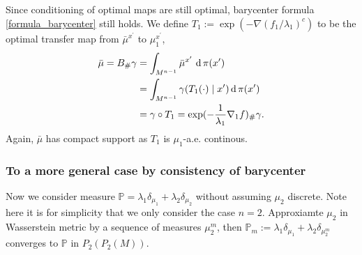 Since conditioning of optimal maps are still optimal,
barycenter formula \cref{formula_barycenter} still holds.
We define $T_1 := \exp(-\nabla (f_1/\lambda_1)^c)$ to be the optimal transfer map from $\bar{\mu}^{x^\prime}$ to $\mu_1^{x^\prime}$,
\begin{align*}
	\bar{\mu} = B_{\#} \gamma & =
	\int_{M^{n-1}}\bar{\mu}^{x^\prime} \, \operatorname{d} \pi(x^\prime)                         \\
	                          & = \int_{M^{n-1}} \gamma( T_1(\cdot) \mid x^\prime) \operatorname{d} \pi(x^\prime)      \\
	                          & = \gamma \circ T_1 = \exp (- \frac{1}{\lambda_1} \nabla_1 f)_{\#} \gamma
	.
\end{align*}
Again, $\bar{\mu}$ has compact support as $T_1$ is $\mu_1$-a.e. continous.




\subsubsection{To a more general case by consistency of barycenter}

Now we consider measure $\mathbb{P} = \lambda_1 \delta_{\mu_1} + \lambda_2 \delta_{\mu_2}$
without assuming $\mu_2$ discrete.
Note here it is for simplicity that we only consider the case $n=2$.
Approxiamte $\mu_2$ in Wasserstein metric by a sequence of measures $\mu_2^{m}$,
then $\mathbb{P}_m := \lambda_1 \delta_{\mu_1} + \lambda_2 \delta_{\mu_2^m}$ converges to $\mathbb{P}$
in $P_2(P_2(M))$.

